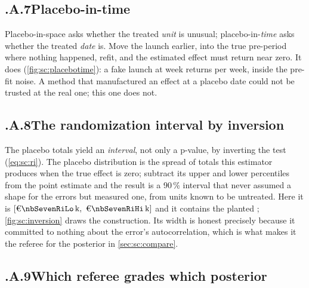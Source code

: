 \subsection*{\thechapter.A.7\quad Placebo-in-time}
\label{app:sc:placebotimeapp}
Placebo-in-space asks whether the treated \emph{unit} is unusual; placebo-in-\emph{time} asks whether
the treated \emph{date} is. Move the launch earlier, into the true pre-period where nothing happened,
refit, and the estimated effect must return near zero. It does (\cref{fig:sc:placebotime}): a fake
launch at week \nbSevenPlaceboTimeWeek{} returns \keur{\nbSevenPlaceboTimeGap} per week, inside the
pre-fit noise. A method that manufactured an effect at a placebo date could not be trusted at the real
one; this one does not.

\subsection*{\thechapter.A.8\quad The randomization interval by inversion}
\label{app:sc:randint}
The placebo totals yield an \emph{interval}, not only a p-value, by inverting the test
(\cref{eq:sc:ri}). The placebo distribution is the spread of totals this estimator produces when the
true effect is zero; subtract its upper and lower percentiles from the point estimate and the result
is a 90\,\% interval that never assumed a shape for the errors but measured one, from units known to be
untreated. Here it is $[\keur{\nbSevenRiLo},\ \keur{\nbSevenRiHi}]$ and it contains the planted
\keur{\nbSevenTrueTotal}; \cref{fig:sc:inversion} draws the construction. Its width is honest
precisely because it committed to nothing about the
error's autocorrelation, which is what makes it the referee for the posterior in \cref{sec:sc:compare}.

\subsection*{\thechapter.A.9\quad Which referee grades which posterior}
\label{app:sc:referee}

